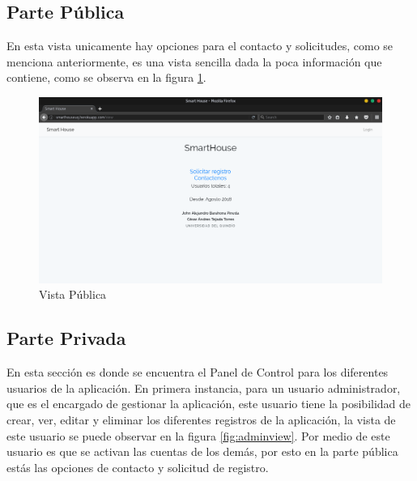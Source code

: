 \subsection{Parte Pública}

En esta vista unicamente hay opciones para el contacto y solicitudes, como se menciona anteriormente, es una vista sencilla dada la poca información que contiene, como se observa en la figura \ref{fig:publicview}.

\begin{figure}[H]
\centering
\caption{Vista Pública}
\label{fig:publicview}
\includegraphics[width=0.9\linewidth]{Imagenes/Public_view}
\end{figure}

\subsection{Parte Privada}

En esta sección es donde se encuentra el Panel de Control para los diferentes usuarios de la aplicación. En primera instancia, para un usuario administrador, que es el encargado de gestionar la aplicación, este usuario tiene la posibilidad de crear, ver, editar y eliminar los diferentes registros de la aplicación, la vista de este usuario se puede observar en la figura \ref{fig:adminview}. Por medio de este usuario es que se activan las cuentas de los demás, por esto en la parte pública estás las opciones de contacto y solicitud de registro.\\

